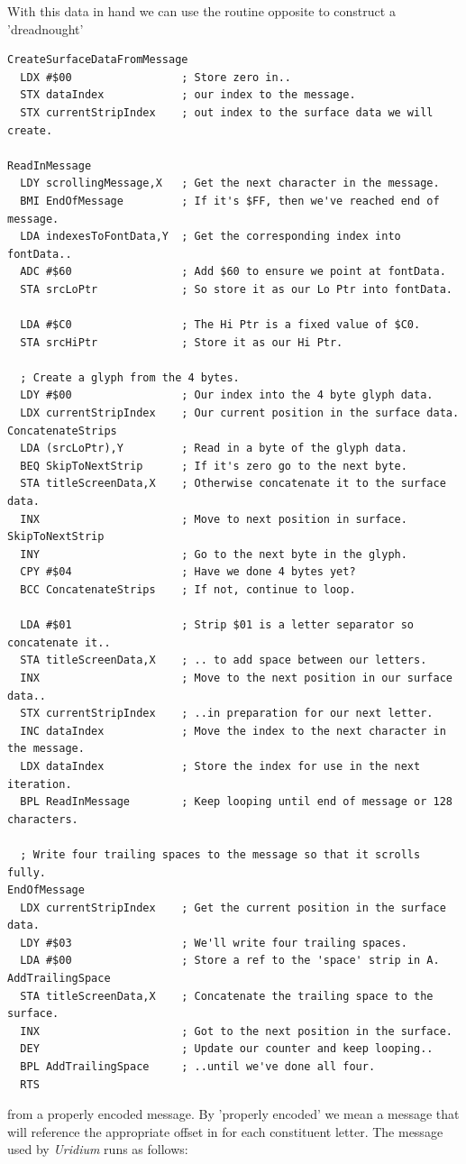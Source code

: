 With this data in hand we can use the routine opposite to construct a 'dreadnought'

\begin{lstlisting}[basicstyle=\scriptsize\ttfamily, escapechar=\%]
CreateSurfaceDataFromMessage
  LDX #$00                 ; Store zero in..
  STX dataIndex            ; our index to the message.
  STX currentStripIndex    ; out index to the surface data we will create.

ReadInMessage   
  LDY scrollingMessage,X   ; Get the next character in the message.
  BMI EndOfMessage         ; If it's $FF, then we've reached end of message.
  LDA indexesToFontData,Y  ; Get the corresponding index into fontData..
  ADC #$60                 ; Add $60 to ensure we point at fontData. 
  STA srcLoPtr             ; So store it as our Lo Ptr into fontData.

  LDA #$C0                 ; The Hi Ptr is a fixed value of $C0.
  STA srcHiPtr             ; Store it as our Hi Ptr.

  ; Create a glyph from the 4 bytes.
  LDY #$00                 ; Our index into the 4 byte glyph data.
  LDX currentStripIndex    ; Our current position in the surface data.
ConcatenateStrips   
  LDA (srcLoPtr),Y         ; Read in a byte of the glyph data.
  BEQ SkipToNextStrip      ; If it's zero go to the next byte.
  STA titleScreenData,X    ; Otherwise concatenate it to the surface data.
  INX                      ; Move to next position in surface.
SkipToNextStrip   
  INY                      ; Go to the next byte in the glyph.
  CPY #$04                 ; Have we done 4 bytes yet?
  BCC ConcatenateStrips    ; If not, continue to loop.

  LDA #$01                 ; Strip $01 is a letter separator so concatenate it..
  STA titleScreenData,X    ; .. to add space between our letters.
  INX                      ; Move to the next position in our surface data..
  STX currentStripIndex    ; ..in preparation for our next letter.
  INC dataIndex            ; Move the index to the next character in the message.
  LDX dataIndex            ; Store the index for use in the next iteration.
  BPL ReadInMessage        ; Keep looping until end of message or 128 characters.

  ; Write four trailing spaces to the message so that it scrolls fully.
EndOfMessage   
  LDX currentStripIndex    ; Get the current position in the surface data.
  LDY #$03                 ; We'll write four trailing spaces.
  LDA #$00                 ; Store a ref to the 'space' strip in A.
AddTrailingSpace   
  STA titleScreenData,X    ; Concatenate the trailing space to the surface.
  INX                      ; Got to the next position in the surface.
  DEY                      ; Update our counter and keep looping..
  BPL AddTrailingSpace     ; ..until we've done all four.
  RTS
\end{lstlisting}
from a properly encoded message. By 'properly encoded' we mean a message that
will reference the appropriate offset in  for each constituent
letter. The message used by \textit{Uridium} runs as follows:


